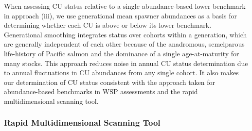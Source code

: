 \documentclass[11pt]{book}
\begin{document}
When assessing CU status relative to a single abundance-based lower benchmark in approach (iii), we use generational mean spawner abundances as a basis for determining whether each CU is above or below its lower benchmark. Generational smoothing integrates status over cohorts within a generation, which are generally independent of each other because of the anadromous, semelparous life-history of Pacific salmon and the dominance of a single age-at-maturity for many stocks. This approach reduces noise in annual CU status determination due to annual fluctuations in CU abundances from any single cohort. It also makes our determination of CU status consistent with the approach taken for abundance-based benchmarks in WSP assessments and the rapid multidimensional scanning tool.

\hypertarget{rapidToolMethods}{%
\subsubsection{Rapid Multidimensional Scanning Tool}\label{rapidToolMethods}}
\end{document}

